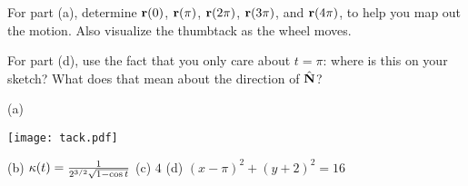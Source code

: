 \begin{hint} 
For part (a), determine $\mathbf{r}(0)$, $\mathbf{r}(\pi)$, $\mathbf{r}(2\pi)$, $\mathbf{r}(3\pi)$, and $\mathbf{r}(4\pi)$, to help you map out the motion. Also visualize the thumbtack as the wheel moves.

For part (d), use the fact that you only care about $t=\pi$: where is this on your sketch? What does that mean about the direction of $\hat{\mathbf{N}}$?
\end{hint}

\begin{answer} 
(a)
\begin{center}
    \texttt{[image: tack.pdf]}
\end{center}

(b) $\kappa(t) = \frac{1}{2^{3/2}\sqrt{1-\cos t}}$\qquad
(c) $4$\qquad
(d) $(x-\pi)^2 +(y+2)^2 = 16$
\end{answer}

